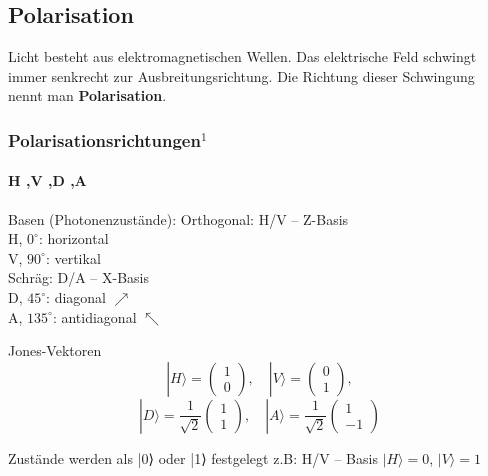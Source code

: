 \subsection{Polarisation}
\begin{frame}
	\begin{Definition}
		Licht besteht aus elektromagnetischen Wellen. Das elektrische Feld schwingt immer senkrecht zur Ausbreitungsrichtung. Die Richtung dieser Schwingung nennt man \textbf{Polarisation}.
	\end{Definition}
\end{frame}
\begin{frame}[allowframebreaks]
	\frametitle{Polarisationsrichtungen$^1$}
	\framesubtitle{H ,V ,D ,A}
	\begin{alertblock}{Basen (Photonenzust{\"a}nde):}
		Orthogonal: H/V – Z-Basis\\
			\hspace{0.5em}  H, $0^\circ$: horizontal \textrightarrow\\
			\hspace{0.5em}  V, $90^\circ$: vertikal  \textuparrow\\
		Schr{\"a}g: D/A – X-Basis\\
			\hspace{0.5em}  D, $45^\circ$: diagonal $\nearrow$\\
			\hspace{0.5em}  A, $135^\circ$: antidiagonal $\nwarrow$\\
	\end{alertblock}
	\begin{alertblock}{Jones-Vektoren}
		\[
		|H\rangle 
		= 
		\left(\begin{array}{c}
			1 \\ 0
		\end{array}\right),
		\quad
		|V\rangle 
		= 
		\left(\begin{array}{c}
			0 \\ 1
		\end{array}\right),
		\]
		\[
		|D\rangle 
		= \frac{1}{\sqrt{2}} 
		\left(\begin{array}{c}
		1 \\ 1
		\end{array}\right),
		\quad
		|A\rangle 
		= \frac{1}{\sqrt{2}} 
		\left(\begin{array}{c}
		1 \\ -1
		\end{array}\right)
		\]
	\end{alertblock}
	\begin{myExamples}{Zustände werden als |0⟩ oder |1⟩ festgelegt}
		z.B: H/V -- Basis \textrightarrow { }$|H\rangle = 0$, $|V\rangle = 1$
	\end{myExamples}
	
\end{frame}

